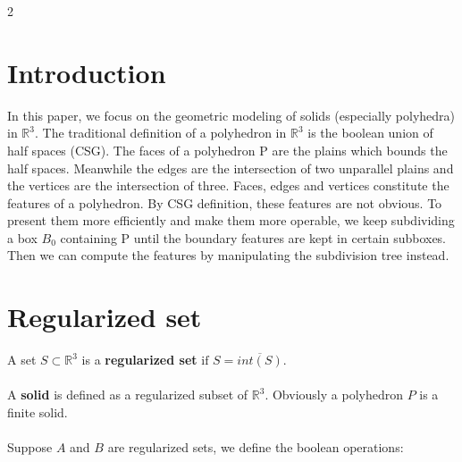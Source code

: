 \documentclass[twoside]{article}
\begin{document}
\begin{multicols}{2} %

\section{Introduction}
\noindent In this paper, we focus on the geometric modeling of solids (especially polyhedra) in $\mathbb{R}^3$. The traditional definition of a polyhedron in $\mathbb{R}^3$ is the boolean union of half spaces (CSG).  The faces of a polyhedron P are the plains which bounds the half spaces. Meanwhile the edges are the intersection of two unparallel plains and the vertices are the intersection of three. Faces, edges and vertices constitute the features of a polyhedron. By CSG definition, these features are not obvious. To present them more efficiently and make them more operable, we keep subdividing a box $B_0$ containing P until the boundary features are kept in certain subboxes. Then we can compute the features by manipulating the subdivision tree instead. 

\section{Regularized set}

      A set $S\subset \mathbb{R}^3$ is a \textbf{regularized set} $\textrm{if}$ $S=\overline{int (S)}$. 
      \\
      \\
      \indent
      A \textbf{solid} is defined as a regularized subset of $\mathbb{R}^3$. Obviously a polyhedron $P$ is a finite solid.
      \\
      \\
      \indent
 Suppose $A$ and $B$ are regularized sets, we define the boolean operations:
 \begin{itemize}


\end{itemize}
\end{multicols}
\end{document}

